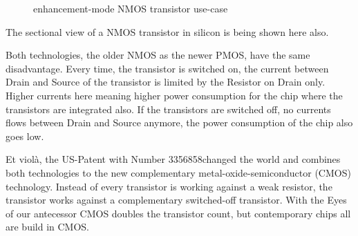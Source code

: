 \begin{center}
    \begin{figure}[h] \caption{enhancement-mode NMOS transistor use-case}
        \begin{circuitdiagram}{20}{20}
        \end{circuitdiagram}
    \end{figure}
\end{center}

The sectional view of a NMOS transistor in silicon is being shown here also.

Both technologies, the older NMOS as the newer PMOS, have the same disadvantage. Every time, the transistor is switched on, the current between Drain and Source of the transistor is limited by the Resistor on Drain only. Higher currents here meaning higher power consumption for the chip where the transistors are integrated also. If the transistors are switched off, no currents flows between Drain and Source anymore, the power consumption of the chip also goes low.

Et violà, the US-Patent with Number 3356858\footnotemark changed the world and combines both technologies to the new complementary metal-oxide-semiconductor (CMOS) technology. Instead of every transistor is working against a weak resistor, the transistor works against a complementary switched-off transistor. With the Eyes of our antecessor CMOS doubles the transistor count, but contemporary chips all are build in CMOS.

